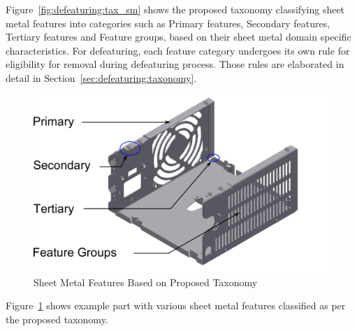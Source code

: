 		
%


Figure~\ref{fig:defeaturing:tax_sm} shows the proposed taxonomy classifying sheet metal features into categories such as Primary features, Secondary features, Tertiary features and Feature groups, based on their sheet metal domain specific characteristics. For defeaturing, each feature category undergoes its own rule for eligibility for removal during defeaturing process. Those rules are elaborated in detail in Section~\ref{sec:defeaturing:taxonomy}.


	\begin{figure} [!h]
		\centering
		\includegraphics[width=0.62\linewidth]{images/SheetMetal_taxonomy_3.pdf}
		\caption{Sheet Metal Features Based on Proposed Taxonomy}
		\label{fig:defeaturing:classification}
	\end{figure}
	

Figure~\ref{fig:defeaturing:classification} shows example part with various sheet metal features classified as per the proposed taxonomy. %



